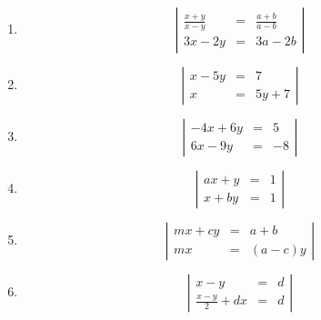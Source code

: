 \documentclass[%
11pt,%
twoside,%
titlepage,%
german,%
]{scrartcl}
\begin{document}
\begin{enumerate}
\begin{enumerate}
  \item 
    \begin{displaymath}
      \left| 
        \begin{array}{rcl}
         \frac{x+y}{x-y} & = & \frac{a+b}{a-b} \\
          3x-2y & = & 3a - 2b
        \end{array} \right|
    \end{displaymath}

  \item 
    \begin{displaymath}
      \left| 
        \begin{array}{rcl}
         x-5y & = & 7 \\
         x & = & 5y+7
        \end{array} \right|
    \end{displaymath}

  \item 
    \begin{displaymath}
      \left| 
        \begin{array}{rcl}
         -4x+6y & = & 5 \\
         6x-9y & = & -8
        \end{array} \right|
    \end{displaymath}

  \item 
    \begin{displaymath}
      \left| 
        \begin{array}{rcl}
         ax+y & = & 1 \\
         x+by & = & 1
        \end{array} \right|
    \end{displaymath}

  \item 
    \begin{displaymath}
      \left| 
        \begin{array}{rcl}
         mx+cy & = & a+b \\
         mx & = & (a-c)y
        \end{array} \right|
    \end{displaymath}

  \item 
    \begin{displaymath}
      \left| 
        \begin{array}{rcl}
         x-y & = & d \\
         \frac{x-y}{2}+dx & = & d
        \end{array} \right|
    \end{displaymath}





\end{enumerate}
\end{enumerate}
\end{document}
